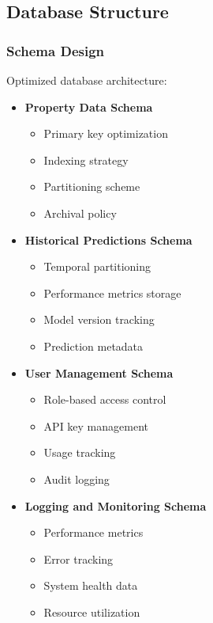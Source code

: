 \documentclass[12pt,a4paper]{report}
\begin{document}
\subsection{Database Structure}
\subsubsection{Schema Design}
Optimized database architecture:

\begin{itemize}
    \item \textbf{Property Data Schema}
    \begin{itemize}
        \item Primary key optimization
        \item Indexing strategy
        \item Partitioning scheme
        \item Archival policy
    \end{itemize}
    
    \item \textbf{Historical Predictions Schema}
    \begin{itemize}
        \item Temporal partitioning
        \item Performance metrics storage
        \item Model version tracking
        \item Prediction metadata
    \end{itemize}
    
    \item \textbf{User Management Schema}
    \begin{itemize}
        \item Role-based access control
        \item API key management
        \item Usage tracking
        \item Audit logging
    \end{itemize}
    
    \item \textbf{Logging and Monitoring Schema}
    \begin{itemize}
        \item Performance metrics
        \item Error tracking
        \item System health data
        \item Resource utilization
    \end{itemize}
\end{itemize}
\end{document}
